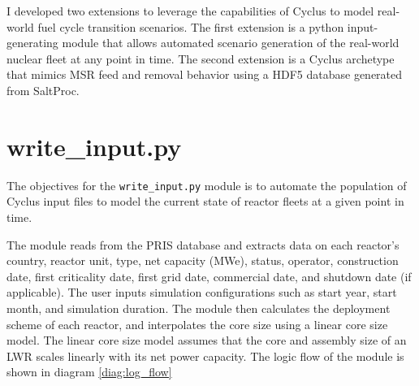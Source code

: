 I developed two extensions to leverage 
the capabilities of Cyclus to model
real-world fuel cycle transition scenarios.
The first extension is a python input-generating module
that allows automated scenario generation of the real-world 
nuclear fleet at any point in time. The second extension
is a Cyclus archetype that mimics \gls{MSR} feed and removal
behavior using a HDF5 database generated from SaltProc.

\section{write\_input.py}
The objectives for the \texttt{write\_input.py} module
is to automate the population of Cyclus input files
to model the current state of reactor fleets at a given
point in time. 

The module reads from the \gls{PRIS} database
and extracts data on each reactor's country, reactor unit,
type, net capacity (MWe), status, operator, construction date,
first criticality date, first grid date, commercial date,
and shutdown date (if applicable). The user inputs simulation
configurations such as start year, start month, and
simulation duration. The module then calculates the deployment
scheme of each reactor, and interpolates the core size using
a linear core size model. The linear core size model assumes
that the core and assembly size of an \gls{LWR} scales linearly
with its net power capacity. The logic flow of the module is 
shown in diagram \ref{diag:log_flow}


